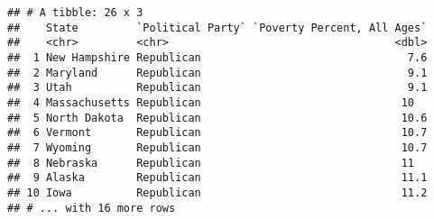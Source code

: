 \documentclass[]{article}
\newenvironment{Shaded}{\begin{snugshade}}{\end{snugshade}}
\newcommand{\CommentTok}[1]{\textcolor[rgb]{0.56,0.35,0.01}{\textit{#1}}}
\newcommand{\DataTypeTok}[1]{\textcolor[rgb]{0.13,0.29,0.53}{#1}}
\newcommand{\KeywordTok}[1]{\textcolor[rgb]{0.13,0.29,0.53}{\textbf{#1}}}
\newcommand{\NormalTok}[1]{#1}
\newcommand{\OperatorTok}[1]{\textcolor[rgb]{0.81,0.36,0.00}{\textbf{#1}}}
\newcommand{\StringTok}[1]{\textcolor[rgb]{0.31,0.60,0.02}{#1}}
\begin{document}
\begin{Shaded}
\end{Shaded}

\begin{verbatim}
## # A tibble: 26 x 3
##    State         `Political Party` `Poverty Percent, All Ages`
##    <chr>         <chr>                                   <dbl>
##  1 New Hampshire Republican                                7.6
##  2 Maryland      Republican                                9.1
##  3 Utah          Republican                                9.1
##  4 Massachusetts Republican                               10  
##  5 North Dakota  Republican                               10.6
##  6 Vermont       Republican                               10.7
##  7 Wyoming       Republican                               10.7
##  8 Nebraska      Republican                               11  
##  9 Alaska        Republican                               11.1
## 10 Iowa          Republican                               11.2
## # ... with 16 more rows
\end{verbatim}

\begin{Shaded}
\end{Shaded}
\end{document}
